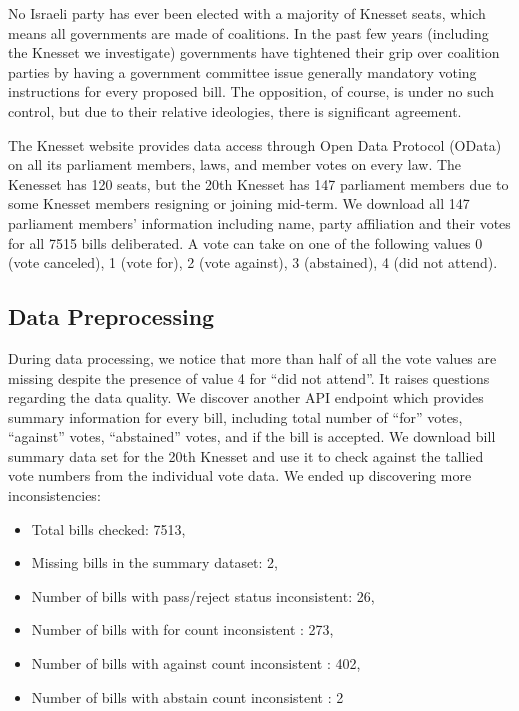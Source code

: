 No Israeli party has ever been elected with a majority of Knesset seats,
which means all governments are made of coalitions.
In the past few years (including the Knesset we investigate)
governments have tightened their grip over coalition parties by having a government committee issue generally mandatory
voting instructions for every proposed bill.
The opposition, of course, is under no such control,
but due to their relative ideologies, there is significant agreement.

The Knesset website provides data access through Open Data Protocol (OData)
on all its parliament members, laws, and member votes on every law.
The Kenesset has 120 seats, but the 20th Knesset has 147 parliament members
due to some Knesset members resigning or joining mid-term.
We download all 147 parliament members' information including name,
party affiliation and their votes for all 7515 bills deliberated.
A vote can take on one of the following values
0 (vote canceled), 1 (vote for), 2 (vote against),
3 (abstained), 4 (did not attend).

\subsection{Data Preprocessing}

During data processing, we notice that more than half of all the vote values
are missing despite the presence of value 4 for ``did not attend''.
It raises questions regarding the data quality.
We discover another API endpoint which provides summary information for
every bill, including total number of ``for'' votes, ``against'' votes,
``abstained'' votes, and if the bill is accepted.
We download bill summary data set for the 20th Knesset and use it
to check against the tallied vote numbers from the individual vote data.
We ended up discovering more inconsistencies:

\begin{itemize}
  \item Total bills checked: 7513,
  \item Missing bills in the summary dataset: 2,
  \item Number of bills with pass/reject status inconsistent: 26,
  \item Number of bills with for count inconsistent : 273,
  \item Number of bills with against count inconsistent : 402,
  \item Number of bills with abstain count inconsistent : 2
\end{itemize}

